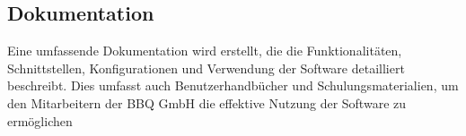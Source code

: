 \documentclass[12pt]{article}
\begin{document}
	\subsection{Dokumentation}
	Eine umfassende Dokumentation wird erstellt, die die Funktionalitäten, Schnittstellen, Konfigurationen und Verwendung der Software detailliert beschreibt. Dies umfasst auch Benutzerhandbücher und Schulungsmaterialien, um den Mitarbeitern der BBQ GmbH die effektive Nutzung der Software zu ermöglichen
 	
 	
 	
 	
 	
 	
	
\end{document}
